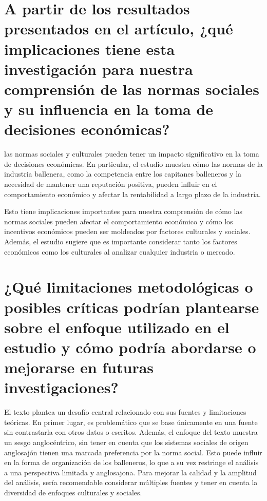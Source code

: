 \documentclass[11pt]{article}
\begin{document}
\section{A partir de los resultados presentados en el artículo, ¿qué implicaciones tiene esta investigación para nuestra comprensión de las normas sociales y su influencia en la toma de decisiones económicas?}

\begin{flushleft}
    las normas sociales y culturales pueden tener un impacto significativo en la toma de decisiones económicas. En particular, el estudio muestra cómo las normas de la industria ballenera, como la competencia entre los capitanes balleneros y la necesidad de mantener una reputación positiva, pueden influir en el comportamiento económico y afectar la rentabilidad a largo plazo de la industria.

    Esto tiene implicaciones importantes para nuestra comprensión de cómo las normas sociales pueden afectar el comportamiento económico y cómo los incentivos económicos pueden ser moldeados por factores culturales y sociales. Además, el estudio sugiere que es importante considerar tanto los factores económicos como los culturales al analizar cualquier industria o mercado.
\end{flushleft}

\section{¿Qué limitaciones metodológicas o posibles críticas podrían plantearse sobre el enfoque utilizado en el estudio y cómo podría abordarse o mejorarse en futuras investigaciones?}

\begin{flushleft}
    El texto plantea un desafío central relacionado con sus fuentes y limitaciones teóricas. En primer lugar, es problemático que se base únicamente en una fuente sin contrastarla con otros datos o escritos. Además, el enfoque del texto muestra un sesgo anglocéntrico, sin tener en cuenta que los sistemas sociales de origen anglosajón tienen una marcada preferencia por la norma social. Esto puede influir en la forma de organización de los balleneros, lo que a su vez restringe el análisis a una perspectiva limitada y anglosajona. Para mejorar la calidad y la amplitud del análisis, sería recomendable considerar múltiples fuentes y tener en cuenta la diversidad de enfoques culturales y sociales.
\end{flushleft}
\end{document}
